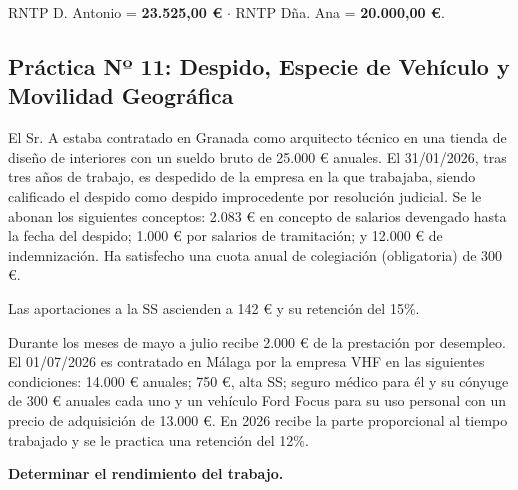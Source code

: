 \documentclass[11pt,a4paper,openany]{article}
\begin{document}
\begin{resultadoBox}
RNTP D. Antonio = \textbf{23.525,00 \euro} $\cdot$ RNTP Dña. Ana = \textbf{20.000,00 \euro}.
\end{resultadoBox}

\vspace{0.4cm}

\subsection{Práctica Nº 11: Despido, Especie de Vehículo y Movilidad Geográfica}

\begin{enunciadoBox}
El Sr. A estaba contratado en Granada como arquitecto técnico en una tienda de diseño de interiores con un sueldo bruto de 25.000 \euro{} anuales. El 31/01/2026, tras tres años de trabajo, es despedido de la empresa en la que trabajaba, siendo calificado el despido como despido improcedente por resolución judicial. Se le abonan los siguientes conceptos: 2.083 \euro{} en concepto de salarios devengado hasta la fecha del despido; 1.000 \euro{} por salarios de tramitación; y 12.000 \euro{} de indemnización. Ha satisfecho una cuota anual de colegiación (obligatoria) de 300 \euro{}.

Las aportaciones a la SS ascienden a 142 \euro{} y su retención del 15\%.

Durante los meses de mayo a julio recibe 2.000 \euro{} de la prestación por desempleo. El 01/07/2026 es contratado en Málaga por la empresa VHF en las siguientes condiciones: 14.000 \euro{} anuales; 750 \euro{}, alta SS; seguro médico para él y su cónyuge de 300 \euro{} anuales cada uno y un vehículo Ford Focus para su uso personal con un precio de adquisición de 13.000 \euro{}. En 2026 recibe la parte proporcional al tiempo trabajado y se le practica una retención del 12\%.

\textbf{Determinar el rendimiento del trabajo.}
\end{enunciadoBox}
\end{document}
